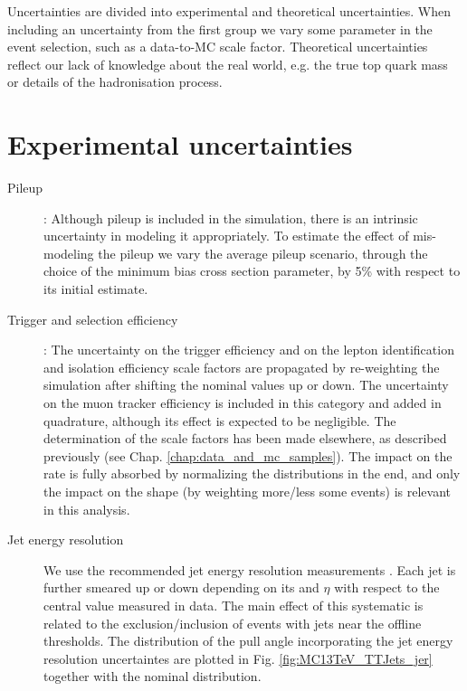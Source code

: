 Uncertainties are divided into experimental and theoretical uncertainties. When including an uncertainty from the first group we vary some parameter in the event selection, such as a data-to-MC scale factor. Theoretical uncertainties reflect our lack of knowledge about the real world, e.g. the true top quark mass or details of the hadronisation process.

\section{Experimental uncertainties}
\begin{description}

\item[Pileup]: Although pileup is included in the simulation, there is an intrinsic uncertainty in modeling it appropriately. To estimate the effect of mis-modeling the pileup we vary the average pileup scenario, through the choice of the minimum bias cross section parameter, by 5\% with respect to its initial estimate. 

\item[Trigger and selection efficiency]: The uncertainty on the trigger efficiency and on the lepton identification and isolation efficiency scale factors are propagated by re-weighting the simulation after shifting the nominal values up or down. The uncertainty on the muon tracker efficiency is included in this category and added in quadrature, although its effect is expected to be negligible.  The determination of the scale factors has been made elsewhere, as described previously (see Chap. \ref{chap:data_and_mc_samples}). The impact on the rate is fully absorbed by normalizing the distributions in the end, and only the impact on the shape (by weighting more/less some events) is relevant in this analysis.


\item[Jet energy resolution] We use the recommended jet energy resolution measurements \cite{twiki:JER}. Each jet is further smeared up or down depending on its \pt and $\eta$ with respect to the central value measured in data. The main effect of this systematic is related to the exclusion/inclusion of events with jets near the offline thresholds. The distribution of the pull angle incorporating the jet energy resolution uncertaintes are plotted in Fig. \ref{fig:MC13TeV_TTJets_jer} together with the nominal distribution.


\end{description}
